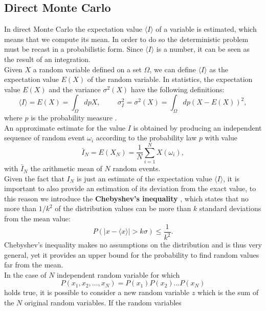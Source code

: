 \subsection{Direct Monte Carlo}
In direct Monte Carlo the expectation value $\langle I\rangle$ of a variable is estimated, which means that we compute its mean. In 
order to do so the deterministic problem must be recast in a probabilistic form. Since $\langle I\rangle$ is a number, it can be seen as 
the result of an integration.\\
Given $X$ a random variable defined on a set $\Omega$, we can define $\langle I\rangle$ as the expectation value $E(X)$ of the random variable.
In statistics, the expectation value $E(X)$ and the variance $\sigma^2(X)$ have the following definitions:
\begin{equation}
\langle I\rangle=E(X)=\int_\Omega dp X,\hspace{1cm}\sigma^2_I=\sigma^2(X)=\int_\Omega dp (X-E(X))^2,
\end{equation}
where $p$ is the probability measure \cite{fehske2007computational}.\\
An approximate estimate for the value $I$ is obtained by producing an independent sequence of random event $\omega_i$ according to the probability 
law $p$ with value
\begin{equation}
    \bar{I}_N=E(X_N)=\frac{1}{N}\sum_{i=1}^NX(\omega_i),
\end{equation}
with $\bar{I}_N$ the arithmetic mean of $N$ random events.\\
Given the fact that $I_N$ is just an estimate of the expectation value $\langle I \rangle$, it is important to also provide an estimation of its deviation 
from the exact value, to this reason we introduce the \textbf{Chebyshev's inequality} \cite{becca2017quantum}, which states that no more 
than $1/k^2$ of the distribution values can be more than $k$ standard deviations from the mean value:
\begin{equation}
    P(|x-\langle x\rangle|> k\sigma)\le\frac{1}{k^2}.
\end{equation}
Chebyshev's inequality makes no assumptions on the distribution and is thus very general, yet it provides an upper bound for the probability 
to find random values far from the mean.\\
In the case of $N$ independent random variable for which 
\begin{equation}
    P(x_1,x_2,...,x_N)=P(x_1)P(x_2)...P(x_N)
\end{equation}
holds true, it is possible to consider a new random variable $z$ which is the sum of the $N$ original random variables. If the random variables 
